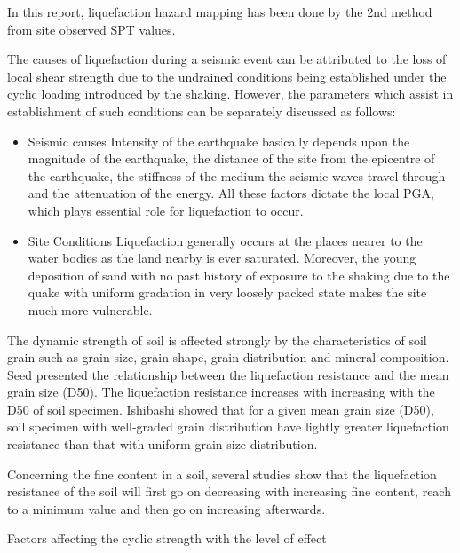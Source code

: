In this report, liquefaction hazard mapping has been done by the 2nd method from site observed SPT values.

The causes of liquefaction during a seismic event can be attributed to the loss of local shear strength due to the undrained conditions being established under the cyclic loading introduced by the shaking. However, the parameters which assist in establishment of such conditions can be separately discussed as follows:

\begin{itemize}
\item Seismic causes
Intensity of the earthquake basically depends upon the magnitude of the earthquake, the distance of the site from the epicentre of the earthquake, the stiffness of the medium the seismic waves travel through and the attenuation of the energy. All these factors dictate the local PGA, which plays essential role for liquefaction to occur.
\item Site Conditions
Liquefaction generally occurs at the places nearer to the water bodies as the land nearby is ever saturated. Moreover, the young deposition of sand with no past history of exposure to the shaking due to the quake with uniform gradation in very loosely packed state makes the site much more vulnerable.
\end{itemize}

The dynamic strength of soil is affected strongly by the characteristics of soil grain such as grain size, grain shape, grain distribution and mineral composition. Seed \cite{r12} presented the relationship between the liquefaction resistance and the mean grain size (D50). The liquefaction resistance increases with increasing with the D50 of soil specimen. Ishibashi\cite{r14}  showed that for a given mean grain size (D50), soil specimen with well-graded grain distribution have lightly greater liquefaction resistance than that with uniform grain size distribution.

Concerning the fine content in a soil, several studies show that the liquefaction resistance of the soil will first go on decreasing with increasing fine content, reach to a minimum value and then go on increasing afterwards. 

Factors affecting the cyclic strength with the level of effect \cite{r13}

